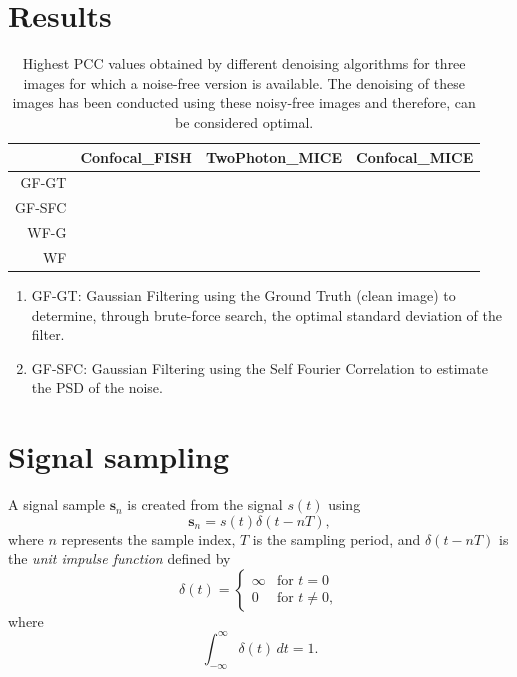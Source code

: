 \documentclass{article}
\begin{document}

\section{Results}

\begin{table}
  \centering
  \begin{tabular}{r|ccc}
    ~~ & Confocal\_FISH & TwoPhoton\_MICE & Confocal\_MICE \\
    \hline
    GF-GT & & & \\
    GF-SFC & & \\
    WF-G & & \\
    WF & & & \\
  \end{tabular}  
  \caption{Highest PCC values obtained by different denoising
    algorithms for three images for which a noise-free version is
    available. The denoising of these images has been conducted using
    these noisy-free images and therefore, can be considered optimal.}
\end{table}

\begin{enumerate}
\item GF-GT: Gaussian Filtering using the Ground Truth (clean image)
  to determine, through brute-force search, the optimal standard
  deviation of the filter.
\item GF-SFC: Gaussian Filtering using the Self Fourier Correlation to
  estimate the PSD of the noise.
\end{enumerate}


\appendix

\section{Signal sampling}

A signal sample $\mathbf{s}_n$ is created from the signal $s(t)$ using
\begin{equation}
  \mathbf{s}_n = s(t)\delta(t-nT),
\end{equation}
where $n$ represents the sample index, $T$ is the sampling period, and
$\delta(t-nT)$ is the \emph{unit impulse function} defined by
\begin{equation}
\delta(t) =
\begin{cases}
\infty & \text{for } t = 0 \\
0 & \text{for } t \neq 0,
\end{cases}
\end{equation}
where
\begin{equation}
\int_{-\infty}^{\infty} \delta(t) \, dt = 1.
\end{equation}
\end{document}
